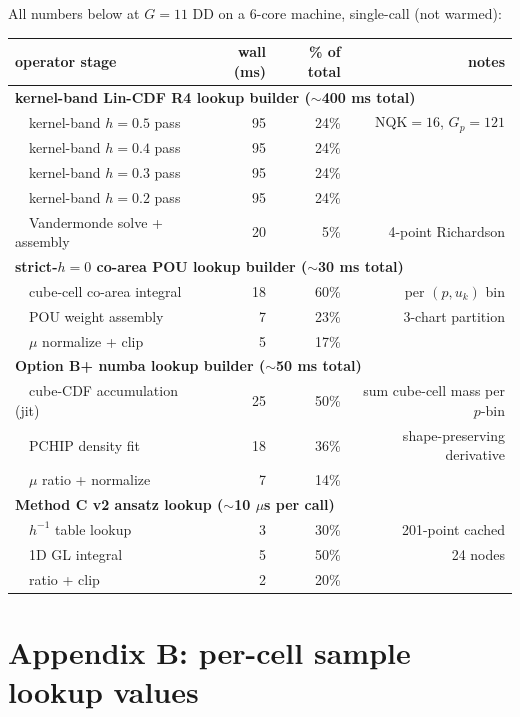 \documentclass[11pt]{article}
\begin{document}
All numbers below at $G = 11$ DD on a 6-core machine, single-call (not
warmed):

\begin{center}\begin{tabular}{lrrr}\toprule
operator stage & wall (ms) & \% of total & notes \\
\midrule
\multicolumn{4}{l}{\textbf{kernel-band Lin-CDF R4 lookup builder ($\sim$400 ms total)}} \\
~~kernel-band $h=0.5$ pass         & 95  & 24\% & $\mathrm{NQK}{=}16$, $G_p{=}121$ \\
~~kernel-band $h=0.4$ pass         & 95  & 24\% & \\
~~kernel-band $h=0.3$ pass         & 95  & 24\% & \\
~~kernel-band $h=0.2$ pass         & 95  & 24\% & \\
~~Vandermonde solve + assembly     & 20  & 5\%  & 4-point Richardson \\
\midrule
\multicolumn{4}{l}{\textbf{strict-$h{=}0$ co-area POU lookup builder ($\sim$30 ms total)}} \\
~~cube-cell co-area integral       & 18  & 60\% & per $(p, u_k)$ bin \\
~~POU weight assembly              & 7   & 23\% & 3-chart partition \\
~~$\mu$ normalize + clip           & 5   & 17\% & \\
\midrule
\multicolumn{4}{l}{\textbf{Option B+ numba lookup builder ($\sim$50 ms total)}} \\
~~cube-CDF accumulation (jit)      & 25  & 50\% & sum cube-cell mass per $p$-bin \\
~~PCHIP density fit                & 18  & 36\% & shape-preserving derivative \\
~~$\mu$ ratio + normalize          & 7   & 14\% & \\
\midrule
\multicolumn{4}{l}{\textbf{Method C v2 ansatz lookup ($\sim$10 $\mu$s per call)}} \\
~~$h^{-1}$ table lookup            & 3   & 30\% & 201-point cached \\
~~1D GL integral                   & 5   & 50\% & 24 nodes \\
~~ratio + clip                     & 2   & 20\% & \\
\bottomrule\end{tabular}\end{center}

\section{Appendix B: per-cell sample lookup values}
\end{document}
